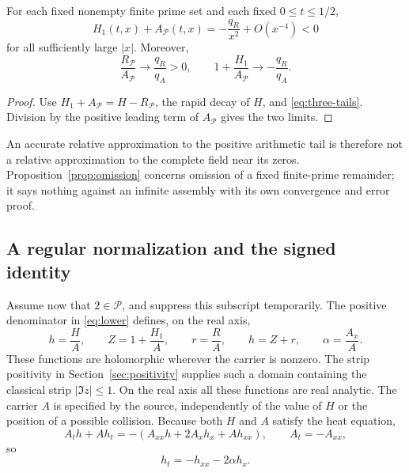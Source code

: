 \begin{proposition}\label{prop:omission}
For each fixed nonempty finite prime set and each fixed
$0\le t\le1/2$,
\[
 H_1(t,x)+A_{\mathcal P}(t,x)
   =-\frac{q_R}{x^2}+O(x^{-4})<0
\]
for all sufficiently large $|x|$. Moreover,
\begin{equation}\label{eq:ratio-limits}
 \frac{R_{\mathcal P}}{A_{\mathcal P}}\longrightarrow\frac{q_R}{q_A}>0,
 \qquad
 1+\frac{H_1}{A_{\mathcal P}}\longrightarrow-\frac{q_R}{q_A}.
\end{equation}
\end{proposition}
\begin{proof}
Use $H_1+A_{\mathcal P}=H-R_{\mathcal P}$, the rapid decay of $H$,
and \eqref{eq:three-tails}. Division by the positive leading term of
$A_{\mathcal P}$ gives the two limits.
\end{proof}

An accurate relative approximation to the positive arithmetic tail is
therefore not a relative approximation to the complete field near its
zeros. Proposition~\ref{prop:omission} concerns omission of a fixed
finite-prime remainder; it says nothing against an infinite assembly with
its own convergence and error proof.

\subsection{A regular normalization and the signed identity}

Assume now that $2\in\mathcal P$, and suppress this subscript temporarily.
The positive denominator in \eqref{eq:lower} defines, on the real axis,
\begin{equation}\label{eq:normalized}
 h=\frac HA,\qquad Z=1+\frac{H_1}A,\qquad r=\frac RA,
 \qquad h=Z+r,\qquad \alpha=\frac{A_x}{A}.
\end{equation}
These functions are holomorphic wherever the carrier is nonzero.
The strip positivity in Section~\ref{sec:positivity} supplies such a
domain containing the classical strip $|\Im z|\le1$. On the real axis
all these functions are real analytic.
The carrier $A$ is specified by the source, independently of the value
of $H$ or the position of a possible collision.
Because both $H$ and $A$ satisfy the heat equation,
\[
 A_t h+A h_t=-(A_{xx}h+2A_xh_x+A h_{xx}),\qquad A_t=-A_{xx},
\]
so
\begin{equation}\label{eq:drift}
 h_t=-h_{xx}-2\alpha h_x.
\end{equation}

